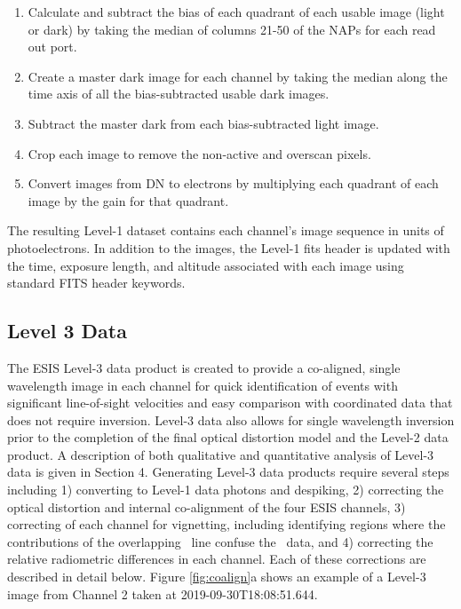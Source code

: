     	\begin{enumerate}
    	    \item Calculate and subtract the bias of each quadrant of each usable image (light or dark) by taking the median of columns 21-50 of the NAPs for each read out port.   
    	    \item Create a master dark image for each channel by taking the median along the time axis of all the bias-subtracted usable dark images.
    	    \item Subtract the master dark from each bias-subtracted light image.
    	    \item Crop each image to remove the non-active and overscan pixels.
    	    \item Convert images from DN to electrons by multiplying each quadrant of each image by the gain for that quadrant.
    	\end{enumerate}
    	The resulting Level-1 dataset contains each channel's image sequence in units of photoelectrons.
    	In addition to the images, the Level-1 fits header is updated with the time, exposure length, and altitude associated with each image using standard FITS header keywords.   
	

    \subsection{Level 3 Data} \label{sec:level-3}
 
    
    	\newcommand{\vigfit}{[0.44, 0.34, 0.38, 0.5]}
    	\newcommand{\levthreetime}{2019-09-30T18:08:51.644}
    	
    	The ESIS Level-3 data product is created to provide a co-aligned, single wavelength image in each channel for quick identification of events with significant line-of-sight velocities and easy comparison with coordinated data that does not require inversion. 
    	Level-3 data also allows for single wavelength inversion prior to the completion of the final optical distortion model and the Level-2 data product.  A description of both qualitative and quantitative analysis of Level-3 data is given in Section 4.  Generating Level-3 data products require several steps including 1) converting to  Level-1 data photons and despiking, 2) correcting the optical distortion and internal co-alignment of the four ESIS channels, 3) correcting of each channel for vignetting, including identifying regions where the contributions of the overlapping \mgxbright \ line confuse the \ov \ data, and 4) correcting the relative radiometric differences in each channel.  Each of these corrections are described in detail below. 
    	Figure \ref{fig:coalign}a shows an example of a Level-3 image from Channel 2  taken at \levthreetime.
    	
